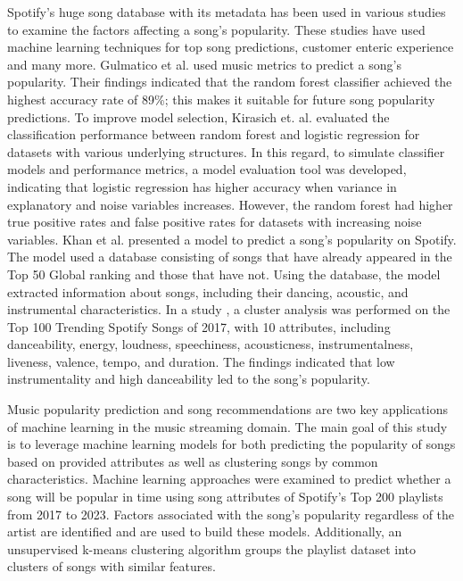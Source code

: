 \documentclass{article}
\begin{document}
Spotify's huge song database with its metadata has been used in various studies to examine the factors affecting a song's popularity. These studies have used machine learning techniques for top song predictions, customer enteric experience and many more. Gulmatico et al. used music metrics to predict a song's popularity. Their findings indicated that the random forest classifier achieved the highest accuracy rate of 89\%; this makes it suitable for future song popularity predictions\cite{gulmatico2022spotipred}. To improve model selection, Kirasich et. al. \cite{kirasich2018random} evaluated the classification performance between random forest and logistic regression for datasets with various underlying structures. In this regard, to simulate classifier models and performance metrics, a model evaluation tool was developed, indicating that logistic regression has higher accuracy when variance in explanatory and noise variables increases. However, the random forest had higher true positive rates and false positive rates for datasets with increasing noise variables. 
Khan et al. \cite{khan2022effect} presented a model to predict a song's popularity on Spotify. The model used a database consisting of songs that have already appeared in the Top 50 Global ranking and those that have not. Using the database, the model extracted information about songs, including their dancing, acoustic, and instrumental characteristics. In a study \cite{al2020cluster}, a cluster analysis was performed on the Top 100 Trending Spotify Songs of 2017, with 10 attributes, including danceability, energy, loudness, speechiness, acousticness, instrumentalness, liveness, valence, tempo, and duration. The findings indicated that low instrumentality and high danceability led to the song's popularity.

Music popularity prediction and song recommendations are two key applications of machine learning in the music streaming domain. The main goal of this study is to leverage machine learning models for both predicting the popularity of songs based on provided attributes as well as clustering songs by common characteristics. Machine learning approaches were examined to predict whether a song will be popular in time using song attributes of Spotify's Top 200 playlists from 2017 to 2023. Factors associated with the song's popularity regardless of the artist are identified and are used to build these models. Additionally, an unsupervised k-means clustering algorithm groups the playlist dataset into clusters of songs with similar features.
\end{document}
